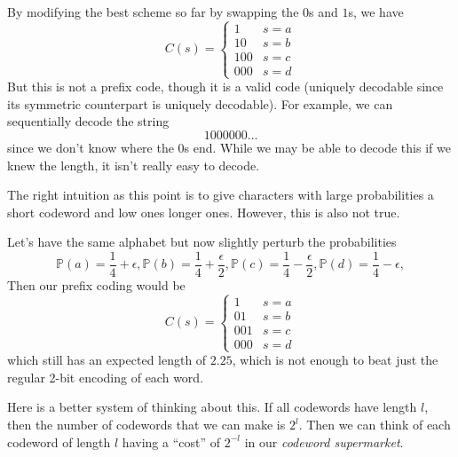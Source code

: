 \documentclass{article}
\begin{document}
    \begin{example}
      By modifying the best scheme so far by swapping the $0$s and $1$s, we have 
        \begin{equation}
          C (s) = \begin{cases} 1 & s = a \\ 10 & s = b \\ 100 & s = c \\ 000 & s = d \end{cases}
        \end{equation}
        But this is not a prefix code, though it is a valid code (uniquely decodable since its symmetric counterpart is uniquely decodable). For example, we can sequentially decode the string 
        \begin{equation}
          1000000\ldots 
        \end{equation}
        since we don't know where the $0$s end. While we may be able to decode this if we knew the length, it isn't really easy to decode. 
    \end{example}

    The right intuition as this point is to give characters with large probabilities a short codeword and low ones longer ones. However, this is also not true. 

    \begin{example}
      Let's have the same alphabet but now slightly perturb the probabilities 
      \begin{equation}
        \mathbb{P}(a) = \frac{1}{4} + \epsilon,
        \mathbb{P}(b) = \frac{1}{4} + \frac{\epsilon}{2},
        \mathbb{P}(c) = \frac{1}{4} - \frac{\epsilon}{2},
        \mathbb{P}(d) = \frac{1}{4} - \epsilon,
      \end{equation}
      Then our prefix coding would be 
      \begin{equation}
        C (s) = \begin{cases} 1 & s = a \\ 01 & s = b \\ 001 & s = c \\ 000 & s = d \end{cases}
      \end{equation}
      which still has an expected length of $2.25$, which is not enough to beat just the regular 2-bit encoding of each word. 
    \end{example}

    Here is a better system of thinking about this. If all codewords have length $l$, then the number of codewords that we can make is $2^l$. Then we can think of each codeword of length $l$ having a ``cost'' of $2^{-l}$ in our \textit{codeword supermarket}. 
\end{document}
